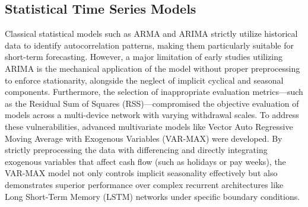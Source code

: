 \documentclass[conference, 12pt, onecolumn]{IEEEtran}
\begin{document}
\subsection{Statistical Time Series Models}
Classical statistical models such as ARMA and ARIMA strictly utilize historical data to identify autocorrelation patterns, making them particularly suitable for short-term forecasting. However, a major limitation of early studies utilizing ARIMA is the mechanical application of the model without proper preprocessing to enforce stationarity, alongside the neglect of implicit cyclical and seasonal components. Furthermore, the selection of inappropriate evaluation metrics—such as the Residual Sum of Squares (RSS)—compromised the objective evaluation of models across a multi-device network with varying withdrawal scales. To address these vulnerabilities, advanced multivariate models like Vector Auto Regressive Moving Average with Exogenous Variables (VAR-MAX) were developed. By strictly preprocessing the data with differencing and directly integrating exogenous variables that affect cash flow (such as holidays or pay weeks), the VAR-MAX model not only controls implicit seasonality effectively but also demonstrates superior performance over complex recurrent architectures like Long Short-Term Memory (LSTM) networks under specific boundary conditions.
\end{document}
